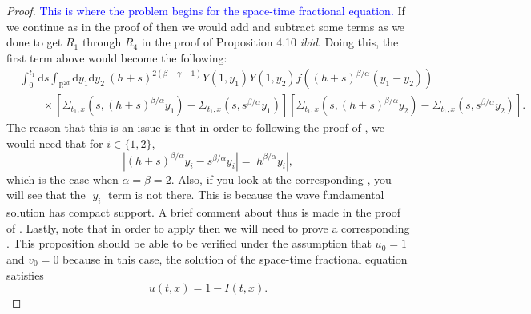 \documentclass[a4paper,11pt]{article}
\numberwithin{equation}{section}
\theoremstyle{plain}
\theoremstyle{definition}
\newcommand{\ud}{\ensuremath{\mathrm{d} }}
\newcommand{\R}{\mathbb{R}}
\numberwithin{NQ}{section}
\numberwithin{LQ}{section}
\numberwithin{ZQ}{section}
\begin{document}
\begin{proof}
  \textcolor{blue}{This is where the problem begins for the space-time fractional equation.} If we
  continue as in the proof of \cite[Proposition 4.10]{millet.sanz-sole:21:global} then we would add
  and subtract some terms as we done to get $R_1$ through $R_4$ in the proof of Proposition 4.10
  {\em ibid}. Doing this, the first term above would become the following:
  \begin{align*}
    & \int_0^{t_1} \ud s \int_{\R^{2d}} \ud y_1 \ud y_2 \: (h+s)^{2(\beta - \gamma - 1)} Y\left(1, y_1 \right) Y\left(1, y_2 \right) f\left((h+s)^{\beta / \alpha}(y_1 - y_2)\right) \\
    & \qquad \times \left[ \Sigma_{t_1, x}\left(s,(h+s)^{\beta / \alpha} y_1\right) - \Sigma_{t_1, x}\left(s, s^{\beta / \alpha} y_1\right)\right] \left[\Sigma_{t_1, x}\left(s, (h+s)^{\beta / \alpha} y_2\right)- \Sigma_{t_1, x}\left(s, s^{\beta / \alpha} y_2\right)\right].
  \end{align*}
  The reason that this is an issue is that in order to following the proof of \cite[Proposition
  4.10]{millet.sanz-sole:21:global}, we would need that for $i \in \{1,2\}$,
  \[
    \left|(h+s)^{\beta/\alpha}y_i - 	s^{\beta/\alpha}y_i\right| = 	\left|h^{\beta/\alpha}y_i\right| ,
  \]
  which is the case when $\alpha = \beta = 2$. Also, if you look at the corresponding \cite[Equation
  (4.63)]{millet.sanz-sole:21:global}, you will see that the $|y_i|$ term is not there. This is
  because the wave fundamental solution has compact support. A brief comment about thus is made in
  the proof of \cite[Theorem 4.1]{hu.huang.ea:14:on}. Lastly, note that in order to apply
  \cite[Equations (4.62) and (4.63)]{millet.sanz-sole:21:global} then we will need to prove a
  corresponding \cite[Proposition 4.9]{millet.sanz-sole:21:global}. This proposition should be able
  to be verified under the assumption that $u_0=1$ and $v_0=0$ because in this case, the solution of
  the space-time fractional equation satisfies
  \[
    u(t,x) = 1 - I(t,x).
  \]
\end{proof}
\end{document}
